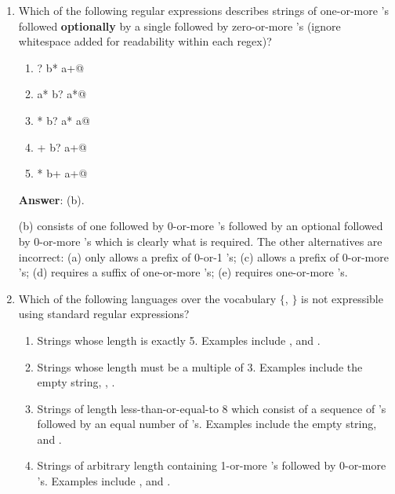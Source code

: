 \documentclass[12pt]{article}
\begin{document}
\begin{enumerate}
\item Which of the following regular expressions describes strings of
  one-or-more \verb@a@'s followed \textbf{optionally} by a single
  \verb@b@ followed by zero-or-more \verb@a@'s (ignore whitespace added
  for readability within each regex)?

\begin{enumerate}

\item \verb@a? b* a+@

\item \verb@a a* b? a*@

\item \verb@a* b? a* a@

\item \verb@a+ b? a+@

\item \verb@a* b+ a+@

\end{enumerate}

\textbf{Answer}: (b).

(b) consists of one \verb@a@ followed by 0-or-more \verb@a@'s followed
by an optional \verb@b@ followed by 0-or-more \verb@a@'s which is
clearly what is required.  The other alternatives are incorrect: (a)
only allows a prefix of 0-or-1 \verb@a@'s; (c) allows a prefix of
0-or-more \verb@a@'s; (d) requires a suffix of one-or-more \verb@a@'s;
(e) requires one-or-more \verb@b@'s.

\item Which of the following languages over the vocabulary $\{$\verb@a@, \verb@b@$\}$ is not expressible using standard regular expressions?

\begin{enumerate}

\item Strings whose length is exactly 5.  Examples include \verb@aabab@,
  \verb@babab@ and \verb@aaaaa@.
  
\item Strings whose length must be a multiple of 3.  Examples include
  the empty string, \verb@aba@, \verb@aabbab@.

\item Strings of length less-than-or-equal-to 8 which consist of
  a sequence of \verb@a@'s followed by an equal number of \verb@b@'s.
  Examples include the empty string, \verb@ab@ and \verb@aaabbb@.

\item Strings of arbitrary length containing 1-or-more \verb@a@'s
  followed by 0-or-more \verb@b@'s.  Examples include \verb@aaa@,
  \verb@a@ and \verb@abbb@.


\end{enumerate}
\end{enumerate}
\end{document}
